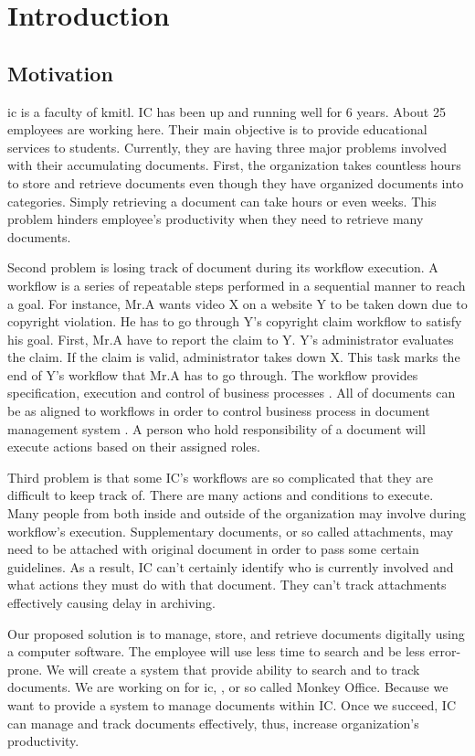 \chapter{Introduction}

\section{Motivation}
\gls{ic} is a faculty of \gls{kmitl}. 
IC has been up and running well for 6 years.
About 25 employees are working here.
Their main objective is to provide educational services to students. 
Currently, they are having three major problems involved with their accumulating documents.
First, the organization takes countless hours to store and retrieve documents even though they have organized documents into categories.
Simply retrieving a document can take hours or even weeks. 
This problem hinders employee's productivity when they need to retrieve many documents. 

Second problem is losing track of document during its workflow execution. 
A workflow is a series of repeatable steps performed in a sequential manner to reach a goal.
For instance, Mr.A wants video X on a website Y to be taken down due to copyright violation.
He has to go through Y's copyright claim workflow to satisfy his goal.
First, Mr.A have to report the claim to Y.
Y's administrator evaluates the claim.
If the claim is valid, administrator takes down X.
This task marks the end of Y's workflow that Mr.A has to go through.
The workflow provides specification, execution and control of business processes \cite{Jablonski:1996:WMM}. 
All of documents can be as aligned to workflows in order to control business process in document management system \cite{DBLP:journals/corr/AsiliT14}.
A person who hold responsibility of a document will execute actions based on their assigned roles.

Third problem is that some IC's workflows are so complicated that they are difficult to keep track of.
There are many actions and conditions to execute.
Many people from both inside and outside of the organization may involve during workflow's execution.
Supplementary documents, or so called attachments, may need to be attached with original document in order to pass some certain guidelines.
As a result, IC can't certainly identify who is currently involved and what actions they must do with that document.
They can't track attachments effectively causing delay in archiving.

Our proposed solution is to manage, store, and retrieve documents digitally using a computer software.
The employee will use less time to search and be less error-prone.
We will create a system that provide ability to search and to track documents.
We are working on \MakeLowercase{\projTitle} for \gls{ic}, \kmitl, or so called Monkey Office.
Because we want to provide a system to manage documents within IC.
Once we succeed, IC can manage and track documents effectively, thus, increase organization's productivity.

